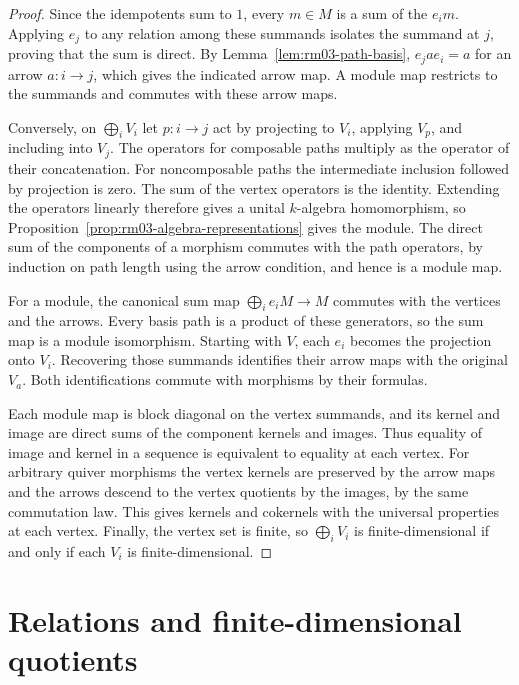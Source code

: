 \documentclass[11pt,oneside,openany]{book}
\theoremstyle{definition}
\theoremstyle{remark}
\begin{document}
\begin{proof}
Since the idempotents sum to \(1\), every \(m\in M\) is a sum of
the \(e_i m\). Applying \(e_j\) to any relation among these
summands isolates the summand at \(j\), proving that the sum is
direct. By Lemma~\ref{lem:rm03-path-basis}, \(e_j a e_i=a\) for
an arrow \(a\colon i\to j\), which gives the indicated arrow map.
A module map restricts to the summands and commutes with these
arrow maps.

Conversely, on \(\bigoplus_i V_i\) let \(p\colon i\to j\) act by
projecting to \(V_i\), applying \(V_p\), and including into
\(V_j\). The operators for composable paths multiply as the
operator of their concatenation. For noncomposable paths the
intermediate inclusion followed by projection is zero. The sum of
the vertex operators is the identity. Extending the operators
linearly therefore gives a unital \(k\)-algebra homomorphism, so
Proposition~\ref{prop:rm03-algebra-representations} gives the
module. The direct sum of the components of a morphism commutes
with the path operators, by induction on path length using the
arrow condition, and hence is a module map.

For a module, the canonical sum map \(\bigoplus_i e_iM\to M\)
commutes with the vertices and the arrows. Every basis path is a
product of these generators, so the sum map is a module
isomorphism. Starting with \(V\), each \(e_i\) becomes the
projection onto \(V_i\). Recovering those summands identifies
their arrow maps with the original \(V_a\). Both identifications
commute with morphisms by their formulas.

Each module map is block diagonal on the vertex summands, and its
kernel and image are direct sums of the component kernels and
images. Thus equality of image and kernel in a sequence is
equivalent to equality at each vertex. For arbitrary quiver
morphisms the vertex kernels are preserved by the arrow maps and
the arrows descend to the vertex quotients by the images, by the
same commutation law. This gives kernels and cokernels with the
universal properties at each vertex. Finally, the vertex set is
finite, so \(\bigoplus_i V_i\) is finite-dimensional if and only if
each \(V_i\) is finite-dimensional.
\end{proof}

\section{Relations and finite-dimensional quotients}
\end{document}
